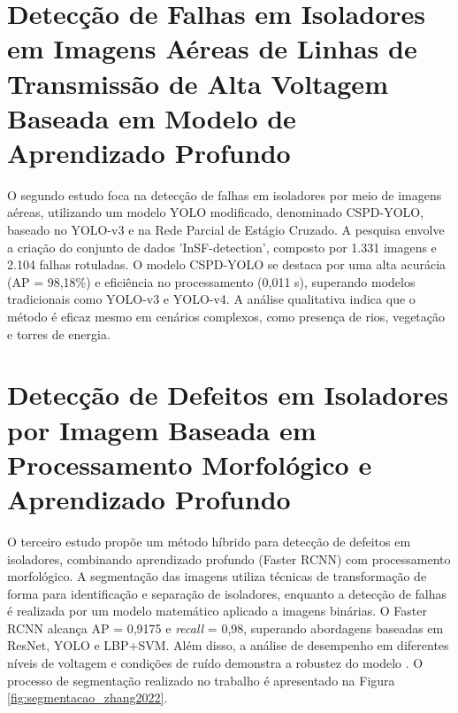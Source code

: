 \section{Detecção de Falhas em Isoladores em Imagens Aéreas de Linhas de Transmissão de Alta Voltagem Baseada em Modelo de Aprendizado Profundo}
O segundo estudo foca na detecção de falhas em isoladores por meio de imagens aéreas, utilizando um modelo YOLO modificado, denominado CSPD-YOLO, baseado no YOLO-v3 e na Rede Parcial de Estágio Cruzado. A pesquisa envolve a criação do conjunto de dados 'InSF-detection', composto por 1.331 imagens e 2.104 falhas rotuladas. O modelo CSPD-YOLO se destaca por uma alta acurácia (AP = 98,18\%) e eficiência no processamento (0,011 s), superando modelos tradicionais como YOLO-v3 e YOLO-v4. A análise qualitativa indica que o método é eficaz mesmo em cenários complexos, como presença de rios, vegetação e torres de energia. \cite{liu2021}

\section{Detecção de Defeitos em Isoladores por Imagem Baseada em Processamento Morfológico e Aprendizado Profundo}
O terceiro estudo propõe um método híbrido para detecção de defeitos em isoladores, combinando aprendizado profundo (Faster RCNN) com processamento morfológico. A segmentação das imagens utiliza técnicas de transformação de forma para identificação e separação de isoladores, enquanto a detecção de falhas é realizada por um modelo matemático aplicado a imagens binárias. O Faster RCNN alcança AP = 0,9175 e \textit{recall} = 0,98, superando abordagens baseadas em ResNet, YOLO e LBP+SVM. Além disso, a análise de desempenho em diferentes níveis de voltagem e condições de ruído demonstra a robustez do modelo \cite{zhang2022}.
O processo de segmentação realizado no trabalho é apresentado na Figura \ref{fig:segmentacao_zhang2022}.

